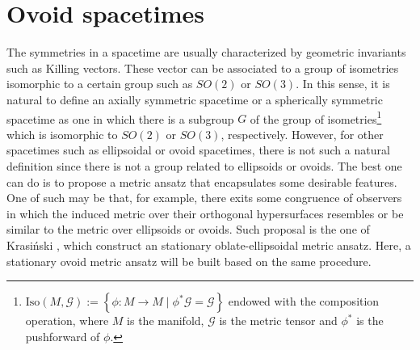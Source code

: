\documentclass[12pt, ams, nofootinbib]{revtex4}
\newcommand{\cub}[1]{\left\{#1\right\}}  %
\newcommand{\mc}[1]{\mathcal{#1}}        %
\theoremstyle{definition}
\begin{document}



\section{Ovoid spacetimes} %
\label{sec:ovoid spacetimes}
The symmetries in a spacetime are usually characterized by geometric invariants such as Killing vectors. These vector can be associated to a group of isometries isomorphic to a certain group such as $SO(2)$ or $SO(3)$. In this sense, it is natural to define an axially symmetric spacetime or a spherically symmetric spacetime as one in which there is a subgroup $G$ of the group of isometries\footnote{$\text{Iso}(M,\mc{G}):=\cub{\phi:M\to M\mid \phi^{*}\mc{G}=\mc{G}}$ endowed with the composition operation, where $M$ is the manifold, $\mc{G}$ is the metric tensor and $\phi^{*}$ is the pushforward of $\phi$.} which is isomorphic to $SO(2)$ or $SO(3)$, respectively. However, for other spacetimes such as ellipsoidal or ovoid spacetimes, there is not such a natural definition since there is not a group related to ellipsoids or ovoids. The best one can do is to propose a metric ansatz that encapsulates some desirable features. One of such may be that, for example, there exits some congruence of observers in which the induced metric over their orthogonal hypersurfaces resembles or be similar to the metric over ellipsoids or ovoids. Such proposal is the one of Krasiński \cite{Krasinski1978}, which construct an stationary oblate-ellipsoidal metric ansatz. Here, a stationary ovoid metric ansatz will be built based on the same procedure. %
\end{document}
